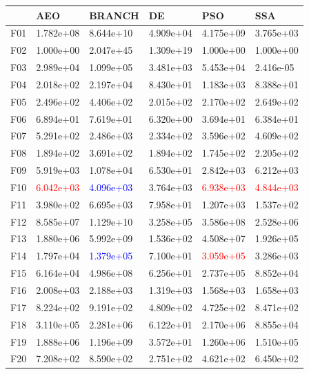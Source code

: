 \documentclass{article}
\begin{document}
\begin{table}[H]
	\centering
\begin{tabular}{|l|lllll|}
	\hline
	{} &        AEO &     BRANCH &         DE &        PSO &        SSA \\
\hline
	F01  &  1.782e+08 &  8.644e+10 &  4.909e+04 &  4.175e+09 &  3.765e+03 \\
	F02  &  1.000e+00 &  2.047e+45 &  1.309e+19 &  1.000e+00 &  1.000e+00 \\
	F03  &  2.989e+04 &  1.099e+05 &  3.481e+03 &  5.453e+04 &  2.416e-05 \\
	F04  &  2.018e+02 &  2.197e+04 &  8.430e+01 &  1.183e+03 &  8.388e+01 \\
	F05  &  2.496e+02 &  4.406e+02 &  2.015e+02 &  2.170e+02 &  2.649e+02 \\
	F06  &  6.894e+01 &  7.619e+01 &  6.320e+00 &  3.694e+01 &  6.384e+01 \\
	F07  &  5.291e+02 &  2.486e+03 &  2.334e+02 &  3.596e+02 &  4.609e+02 \\
	F08  &  1.894e+02 &  3.691e+02 &  1.894e+02 &  1.745e+02 &  2.205e+02 \\
	F09  &  5.919e+03 &  1.078e+04 &  6.530e+01 &  2.842e+03 &  6.212e+03 \\
	F10  &  \textcolor{red}{6.042e+03} &  \textcolor{blue}{4.096e+03} &  3.764e+03 &  \textcolor{red}{6.938e+03} &  \textcolor{red}{4.844e+03} \\
	F11  &  3.980e+02 &  6.695e+03 &  7.958e+01 &  1.207e+03 &  1.537e+02 \\
	F12  &  8.585e+07 &  1.129e+10 &  3.258e+05 &  3.586e+08 &  2.528e+06 \\
	F13  &  1.880e+06 &  5.992e+09 &  1.536e+02 &  4.508e+07 &  1.926e+05 \\
	F14  &  1.797e+04 &  \textcolor{blue}{1.379e+05} &  7.100e+01 &  \textcolor{red}{3.059e+05} &  3.286e+03 \\
	F15  &  6.164e+04 &  4.986e+08 &  6.256e+01 &  2.737e+05 &  8.852e+04 \\
	F16  &  2.008e+03 &  2.188e+03 &  1.319e+03 &  1.568e+03 &  1.658e+03 \\
	F17  &  8.224e+02 &  9.191e+02 &  4.809e+02 &  4.725e+02 &  8.471e+02 \\
	F18  &  3.110e+05 &  2.281e+06 &  6.122e+01 &  2.170e+06 &  8.855e+04 \\
	F19  &  1.888e+06 &  1.196e+09 &  3.572e+01 &  1.260e+06 &  1.510e+05 \\
	F20  &  7.208e+02 &  8.590e+02 &  2.751e+02 &  4.621e+02 &  6.450e+02 \\

\end{tabular}
\end{table}
\end{document}
